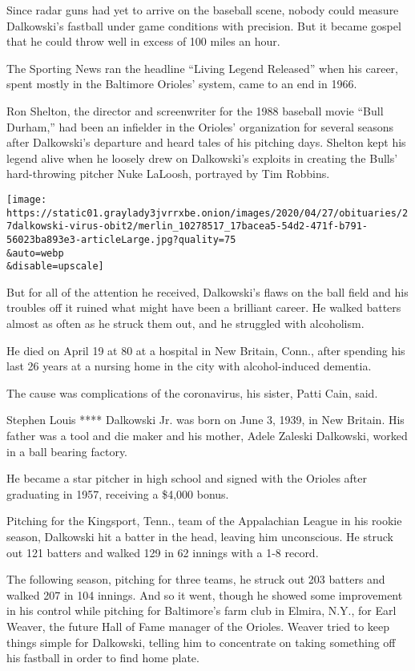 Since radar guns had yet to arrive on the baseball scene, nobody could
measure Dalkowski's fastball under game conditions with precision. But
it became gospel that he could throw well in excess of 100 miles an
hour.

The Sporting News ran the headline ``Living Legend Released'' when his
career, spent mostly in the Baltimore Orioles' system, came to an end in
1966.

Ron Shelton, the director and screenwriter for the 1988 baseball movie
``Bull Durham,'' had been an infielder in the Orioles' organization for
several seasons after Dalkowski's departure and heard tales of his
pitching days. Shelton kept his legend alive when he loosely drew on
Dalkowski's exploits in creating the Bulls' hard-throwing pitcher Nuke
LaLoosh, portrayed by Tim Robbins.

\texttt{[image: https://static01.graylady3jvrrxbe.onion/images/2020/04/27/obituaries/27dalkowski-virus-obit2/merlin\_10278517\_17bacea5-54d2-471f-b791-56023ba893e3-articleLarge.jpg?quality=75\\\&auto=webp\\\&disable=upscale]}

But for all of the attention he received, Dalkowski's flaws on the ball
field and his troubles off it ruined what might have been a brilliant
career. He walked batters almost as often as he struck them out, and he
struggled with alcoholism.

He died on April 19 at 80 at a hospital in New Britain, Conn., after
spending his last 26 years at a nursing home in the city with
alcohol-induced dementia.

The cause was complications of the coronavirus, his sister, Patti Cain,
said.

Stephen Louis **** Dalkowski Jr. was born on June 3, 1939, in New
Britain. His father was a tool and die maker and his mother, Adele
Zaleski Dalkowski, worked in a ball bearing factory.

He became a star pitcher in high school and signed with the Orioles
after graduating in 1957, receiving a \$4,000 bonus.

Pitching for the Kingsport, Tenn., team of the Appalachian League in his
rookie season, Dalkowski hit a batter in the head, leaving him
unconscious. He struck out 121 batters and walked 129 in 62 innings with
a 1-8 record.

The following season, pitching for three teams, he struck out 203
batters and walked 207 in 104 innings. And so it went, though he showed
some improvement in his control while pitching for Baltimore's farm club
in Elmira, N.Y., for Earl Weaver, the future Hall of Fame manager of the
Orioles. Weaver tried to keep things simple for Dalkowski, telling him
to concentrate on taking something off his fastball in order to find
home plate.

